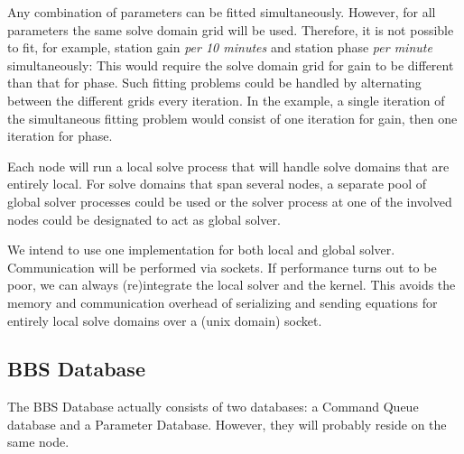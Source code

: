 \documentclass[10pt]{lofar}
\begin{document}
Any combination of parameters can be fitted simultaneously. However, for all
parameters the same solve domain grid will be used. Therefore, it is not
possible to fit, for example, station gain \emph{per 10 minutes} and station
phase \emph{per minute} simultaneously: This would require the solve domain grid
for gain to be different than that for phase. Such fitting problems could be
handled by alternating between the different grids every iteration. In the
example, a single iteration of the simultaneous fitting problem would consist
of one iteration for gain, then one iteration for phase.

Each node will run a local solve process that will handle solve domains that are
entirely local. For solve domains that span several nodes, a separate pool of
global solver processes could be used or the solver process at one of the
involved nodes could be designated to act as global solver.

We intend to use one implementation for both local and global solver.
Communication will be performed via sockets. If performance turns out to be
poor, we can always (re)integrate the local solver and the kernel. This avoids
the memory and communication overhead of serializing and sending equations for
entirely local solve domains over a (unix domain) socket.

\subsection{BBS Database}
\label{subsec:design-database}
The BBS Database actually consists of two databases: a Command Queue database
and a Parameter Database. However, they will probably reside on the same node.
\end{document}
